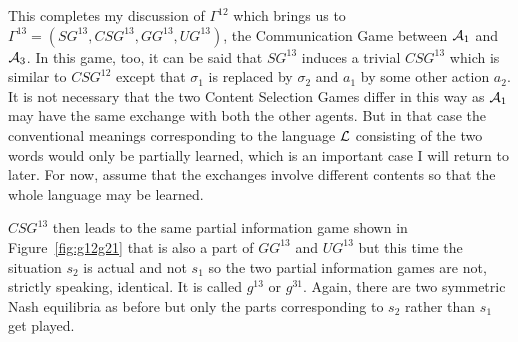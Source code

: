 This completes my discussion of $\Gamma^{12}$ which brings us to $\Gamma^{13} = (SG^{13}, CSG^{13},\allowbreak GG^{13}, UG^{13})$, the Communication Game between ${\cal A}_1$ and ${\cal A}_3$. In this game, too, it can be said that $SG^{13}$ induces a trivial $CSG^{13}$ which is similar to $CSG^{12}$ except that $\sigma_1$ is replaced by $\sigma_2$ and $a_1$ by some other action $a_2$. It is not necessary that the two Content Selection Games differ in this way as ${\cal A}_1$ may have the same exchange with both the other agents. But in that case the conventional meanings corresponding to the language $\cal L$ consisting of the two words would only be partially learned, which is an important case I will return to later. For now, assume that the exchanges involve different contents so that the whole language may be learned.

$CSG^{13}$ then leads to the same partial information game shown in Figure~\ref{fig:g12g21} that is also a part of $GG^{13}$ and $UG^{13}$ but this time the situation $s_2$ is actual and not $s_1$ so the two partial information games are not, strictly speaking, identical. It is called $g^{13}$ or $g^{31}$. Again, there are two symmetric Nash equilibria as before but only the parts corresponding to $s_2$ rather than $s_1$ get played.


%
%
%
%
%
%
%
%
%


